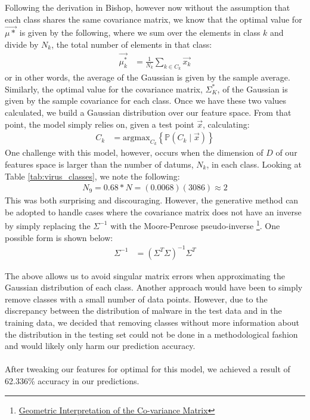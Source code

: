 \documentclass[letterpaper]{article}
\begin{document}
\noindent Following the derivation in Bishop, however now without the assumption that each class shares the same covariance matrix, we know that the optimal value for $\vec{\mu*}$ is given by the following, where we sum over the elements in class $k$ and divide by $N_k$, the total number of elements in that class:
\begin{align}
	\vec{\mu_k^*} &= \frac{1}{N_k}\sum_{k \in C_k} \vec{x_k}
\end{align}
or in other words, the average of the Gaussian is given by the sample average. Similarly, the optimal value for the covariance matrix, \textbf{$\Sigma_K^*$}, of the Gaussian is given by the sample covariance for each class. Once we have these two values calculated, we build a Gaussian distribution over our feature space. From that point, the model simply relies on, given a test point $\vec{x}$, calculating:
\begin{align}
	C_k &= \text{argmax}_{C_k} \left\{\mathbb{P}(C_k \mid \vec{x}) \right\}
\end{align}
One challenge with this model, however, occurs when the dimension of $D$ of our features space is larger than the number of datums, $N_k$, in each class. Looking at Table \ref{tab:virus_classes}, we note the following:
\begin{align*}
	N_9 = 0.68 * N = (0.0068)(3086) \approx 2
\end{align*}
This was both surprising and discouraging. However, the generative method can be adopted to handle cases where the covariance matrix does not have an inverse by simply replacing the $\Sigma^{-1}$ with the Moore-Penrose pseudo-inverse \footnote{\href{http://www.visiondummy.com/2014/04/geometric-interpretation-covariance-matrix/}{Geometric Interpretation of the Co-variance Matrix}}. One possible form is shown below:
\begin{align}
	\Sigma^{-1} &= (\Sigma^T\Sigma)^{-1}\Sigma^T 
\end{align}

\noindent The above allows us to avoid singular matrix errors when approximating the Gaussian distribution of each class. Another approach would have been to simply remove classes with a small number of data points. However, due to the discrepancy between the distribution of malware in the test data and in the training data, we decided that removing classes without more information about the distribution in the testing set could not be done in a methodological fashion and would likely only harm our prediction accuracy.\\
\\
\noindent After tweaking our features for optimal for this model, we achieved a result of 62.336\% accuracy in our predictions.
\end{document}
